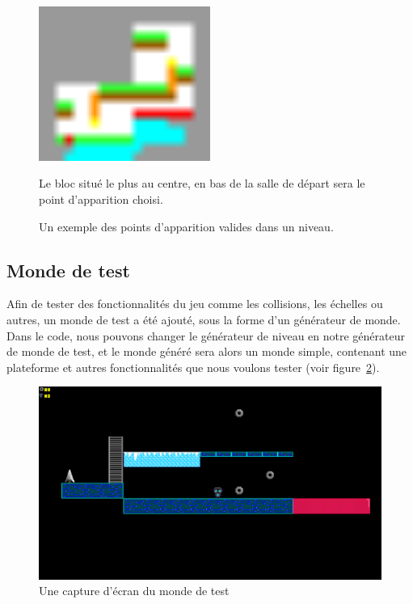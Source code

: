\documentclass[10pt]{report}
\begin{document}
\begin{figure}[H]
  \centering
  \includegraphics[width=0.5\textwidth]{images/valid_spawn_locations}
  \caption{Un exemple des points d'apparition valides dans un niveau.}
  Le bloc situé le plus au centre, en bas de la salle de départ sera le point d'apparition choisi.
  \label{fig:spawn_points}
\end{figure}

\subsection{Monde de test}

Afin de tester des fonctionnalités du jeu comme les collisions, les 
échelles ou autres, un monde de test a été ajouté, sous la forme d'un 
générateur de monde.
Dans le code, nous pouvons changer le générateur de
niveau en notre générateur de monde de test, et le monde généré sera alors
un monde simple, contenant une plateforme et autres fonctionnalités que
nous voulons tester (voir figure~\ref{fig:test_world}).

\begin{figure}[H]
  \centering
  \includegraphics[width=\textwidth]{images/test_world}
  \caption{Une capture d'écran du monde de test}
  \label{fig:test_world}
\end{figure}
\end{document}
